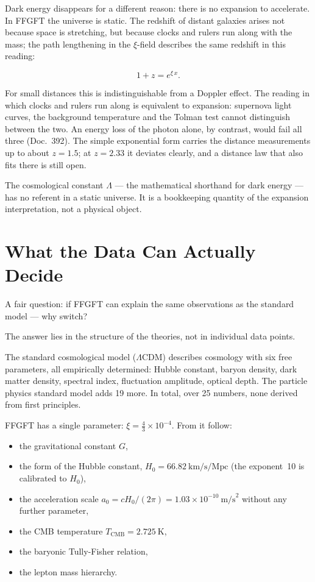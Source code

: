 \documentclass[11pt,oneside]{book}
\begin{document}
Dark energy disappears for a different reason: there is no
expansion to accelerate. In FFGFT the universe is static.
The redshift of distant galaxies arises not because space
is stretching, but because clocks and rulers run along with
the mass; the path lengthening in the $\xi$-field describes
the same redshift in this reading:

\[
  1 + z = e^{\xi\,x} .
\]

For small distances this is indistinguishable from a Doppler
effect. The reading in which clocks and rulers run along is
equivalent to expansion: supernova light curves, the
background temperature and the Tolman test cannot distinguish
between the two. An energy loss of the photon alone, by
contrast, would fail all three (Doc.~392). The simple
exponential form carries the distance measurements up to
about $z=1.5$; at $z=2.33$ it deviates clearly, and a distance
law that also fits there is still open.

The cosmological constant $\Lambda$ — the mathematical
shorthand for dark energy — has no referent in a static
universe. It is a bookkeeping quantity of the expansion
interpretation, not a physical object.

\chapter{What the Data Can Actually Decide}

A fair question: if FFGFT can explain the same observations
as the standard model — why switch?

The answer lies in the structure of the theories, not in
individual data points.

The standard cosmological model ($\Lambda$CDM) describes
cosmology with six free parameters, all empirically
determined: Hubble constant, baryon density, dark matter
density, spectral index, fluctuation amplitude, optical
depth. The particle physics standard model adds 19 more.
In total, over 25 numbers, none derived from first
principles.

FFGFT has a single parameter: $\xi = \tfrac{4}{3}
\times 10^{-4}$. From it follow:
\begin{itemize}
  \item the gravitational constant $G$,
  \item the form of the Hubble constant, $H_0 = 66{.}82~\text{km/s/Mpc}$
    (the exponent~10 is calibrated to $H_0$),
  \item the acceleration scale $a_0 = cH_0/(2\pi) = 1{.}03 \times 10^{-10}~\text{m/s}^2$
    without any further parameter,
  \item the CMB temperature $T_\text{CMB} = 2{.}725~\text{K}$,
  \item the baryonic Tully-Fisher relation,
  \item the lepton mass hierarchy.
\end{itemize}
\end{document}

